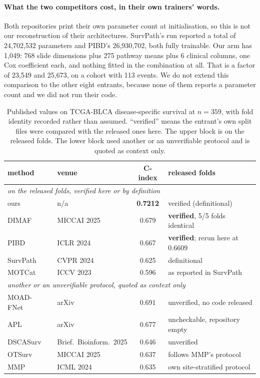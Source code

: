 \documentclass[11pt]{article}
\begin{document}
\paragraph{What the two competitors cost, in their own trainers' words.} Both repositories print
their own parameter count at initialisation, so this is not our reconstruction of their
architectures. SurvPath's run reported a total of 24{,}702{,}532 parameters and PIBD's
26{,}930{,}702, both fully trainable. Our arm has 1{,}049: 768 slide dimensions plus
275 pathway means plus 6 clinical columns, one Cox coefficient each, and nothing fitted in
the combination at all. That is a factor of 23{,}549 and 25{,}673, on a cohort
with 113 events. We do not extend this comparison to the other eight entrants, because none of them
reports a parameter count and we did not run their code.

\begin{table}[t]
\centering
\caption{Published values on TCGA-BLCA disease-specific survival at $n=359$, with fold identity
recorded rather than assumed. ``verified'' means the entrant's own split files were compared with
the released ones here. The upper block is on the released folds. The lower block used another
or an unverifiable protocol and is quoted as context only.}
\label{tab:published}
\begin{tabular}{llcl}
\toprule
method & venue & C-index & released folds \\
\midrule
\multicolumn{4}{l}{\emph{on the released folds, verified here or by definition}} \\
ours          & n/a                & \textbf{0.7212} & verified (definitional) \\
DIMAF~\citep{eijpe2025dimaf}          & MICCAI 2025 & 0.679 & \textbf{verified}, 5/5 folds identical \\
PIBD~\citep{zhang2024pibd}       & ICLR 2024 & 0.667 & \textbf{verified}; rerun here at $0.6609$ \\
SurvPath~\citep{jaume2024survpath} & CVPR 2024 & 0.625 & definitional \\
MOTCat~\citep{xu2023motcat}      & ICCV 2023 & 0.596 & as reported in SurvPath \\
\midrule
\multicolumn{4}{l}{\emph{another or an unverifiable protocol, quoted as context only}} \\
MOAD-FNet~\citep{moadfnet2024}   & arXiv    & 0.691 & unverified, no code released \\
APL~\citep{apl2025}              & arXiv    & 0.677 & uncheckable, repository empty \\
DSCASurv~\citep{song2025dscasurv}    & Brief.\ Bioinform.\ 2025 & 0.646 & unverified \\
OTSurv~\citep{ren2025otsurv}        & MICCAI 2025 & 0.637 & follows MMP's protocol \\
MMP~\citep{song2024mmp}          & ICML 2024 & 0.635 & own site-stratified protocol \\
\bottomrule
\end{tabular}
\end{table}
\end{document}

